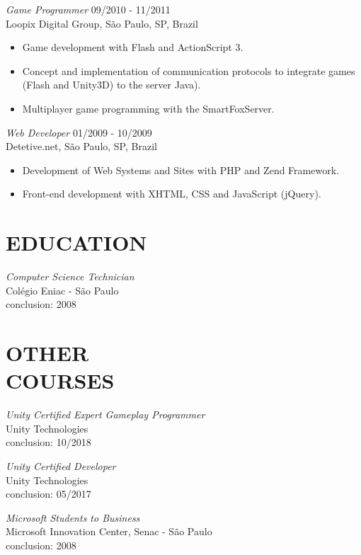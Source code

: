 \documentclass[line,margin]{res}
\begin{document}
\begin{resume}
        {\sl Game Programmer} \hfill 09/2010 - 11/2011 \\
                Loopix Digital Group, São Paulo, SP, Brazil
        \begin{itemize}  \itemsep 1.25pt
                \item Game development with Flash and ActionScript 3.
                \item Concept and implementation of communication protocols to integrate games (Flash and Unity3D) to the server Java).
                \item Multiplayer game programming with the SmartFoxServer.
        \end{itemize}
 
        {\sl Web Developer} \hfill 01/2009 - 10/2009 \\
                Detetive.net, São Paulo, SP, Brazil
        \begin{itemize}  \itemsep 1.25pt
                \item Development of Web Systems and Sites with PHP and Zend Framework.
                \item Front-end development with XHTML, CSS and JavaScript (jQuery).
        \end{itemize} 

\section{EDUCATION}
        {\sl Computer Science Technician} \\
                Colégio Eniac - São Paulo \\
                conclusion: 2008
                
\section{OTHER \\ COURSES}   
        {\sl Unity Certified Expert Gameplay Programmer } \\
                Unity Technologies \\
                conclusion: 10/2018

        {\sl Unity Certified Developer } \\
                Unity Technologies \\
                conclusion: 05/2017
                
        {\sl Microsoft Students to Business} \\
                Microsoft Innovation Center, Senac - São Paulo \\
                conclusion: 2008 


\end{resume}
\end{document}

